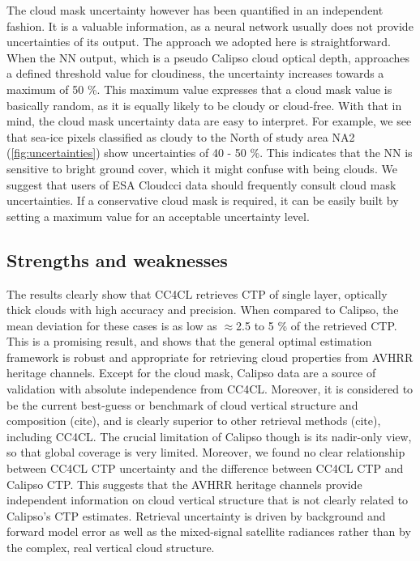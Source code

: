 The cloud mask uncertainty however has been quantified in an independent fashion. It is a valuable information, as a neural network usually does not provide uncertainties of its output. The approach we adopted here is straightforward. When the NN output, which is a pseudo Calipso cloud optical depth, approaches a defined threshold value for cloudiness, the uncertainty increases towards a maximum of 50 \%. This maximum value expresses that a cloud mask value is basically random, as it is equally likely to be cloudy or cloud-free. With that in mind, the cloud mask uncertainty data are easy to interpret. For example, we see that sea-ice pixels classified as cloudy to the North of study area NA2 (\cref{fig:uncertainties}) show uncertainties of 40 - 50 \%. This indicates that the NN is sensitive to bright ground cover, which it might confuse with being clouds. We suggest that users of ESA Cloud\textunderscore cci data should frequently consult cloud mask uncertainties. If a conservative cloud mask is required, it can be easily built by setting a maximum value for an acceptable uncertainty level.

\subsection{Strengths and weaknesses}

The results clearly show that CC4CL retrieves CTP of single layer, optically thick clouds with high accuracy and precision. When compared to Calipso, the mean deviation for these cases is as low as $\approx$2.5 to 5 \% of the retrieved CTP. This is a promising result, and shows that the general optimal estimation framework is robust and appropriate for retrieving cloud properties from AVHRR heritage channels. Except for the cloud mask, Calipso data are a source of validation with absolute independence from CC4CL. Moreover, it is considered to be the current best-guess or benchmark of cloud vertical structure and composition (cite), and is clearly superior to other retrieval methods (cite), including CC4CL. The crucial limitation of Calipso though is its nadir-only view, so that global coverage is very limited. Moreover, we found no clear relationship between CC4CL CTP uncertainty and the difference between CC4CL CTP and Calipso CTP. This suggests that the AVHRR heritage channels provide independent information on cloud vertical structure that is not clearly related to Calipso's CTP estimates. Retrieval uncertainty is driven by background and forward model error as well as the mixed-signal satellite radiances rather than by the complex, real vertical cloud structure.

